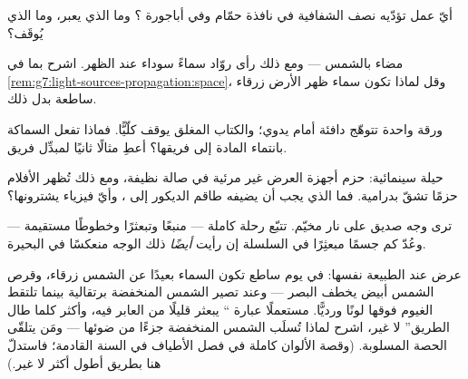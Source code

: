\begin{exercise}[$\star$]\label{exo:g7:light-sources-propagation:7}
أيّ عمل تؤدّيه نصف الشفافية في نافذة حمّام وفي أباجورة ؟
وما الذي يعبر، وما الذي يُوقَف؟
\end{exercise}

\begin{exercise}[$\star$]\label{exo:g7:light-sources-propagation:8}
 مضاء بالشمس --- ومع ذلك رأى روّاد  سماءً سوداء عند
الظهر. اشرح بما في
\cref{rem:g7:light-sources-propagation:space}، وقل لماذا تكون
سماء ظهر الأرض زرقاء ساطعة بدل ذلك.
\end{exercise}

\begin{exercise}[$\star\star$]\label{exo:g7:light-sources-propagation:9}
ورقة واحدة تتوهّج دافئة أمام  يدوي؛ والكتاب المغلق يوقف
 كلّيًّا. فماذا تفعل السماكة بانتماء المادة إلى فريقها؟
أعطِ مثالًا ثانيًا لمبدِّل فريق.
\end{exercise}

\begin{exercise}[$\star\star$]\label{exo:g7:light-sources-propagation:10}
حيلة سينمائية: حزم أجهزة العرض غير مرئية في صالة نظيفة، ومع
ذلك تُظهر الأفلام حزمًا تشقّ  بدرامية. فما الذي يجب أن
يضيفه طاقم الديكور إلى ، وأيّ فيزياء يشترونها؟
\end{exercise}

\begin{exercise}[$\star\star$]\label{exo:g7:light-sources-propagation:11}
ترى وجه صديق على  نار مخيّم. تتبّع رحلة  كاملة ---
منبعًا وتبعثرًا وخطوطًا مستقيمة --- وعُدّ كم جسمًا مبعثِرًا في
السلسلة إن رأيت \emph{أيضًا} ذلك الوجه منعكسًا في البحيرة.
\end{exercise}

\begin{exercise}[$\star\star\star$]\label{exo:g7:light-sources-propagation:12}
عرض  عند الطبيعة نفسها: في يوم ساطع تكون السماء بعيدًا عن
الشمس زرقاء، وقرص الشمس أبيض يخطف البصر --- وعند  تصير
الشمس المنخفضة برتقالية بينما تلتقط الغيوم فوقها لونًا
ورديًّا. مستعملًا عبارة `` يبعثر قليلًا من  العابر
فيه، وأكثر كلما طال الطريق'' لا غير، اشرح لماذا تُسلَب الشمس
المنخفضة جزءًا من ضوئها --- ومَن يتلقّى الحصة المسلوبة. (وقصة
الألوان كاملة في فصل الأطياف في السنة القادمة؛ فاستدلّ هنا
بطريق أطول  أكثر لا غير.)
\end{exercise}

